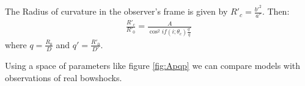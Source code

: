 The Radius of curvature in the observer's frame is given by $R'_c=\frac{b'^2}{a'}$. Then:
\begin{align}
  \frac{R'_c}{R'_0} = \frac{A}{\cos^2 i f(i;\theta_c)\frac{q'}{q}}
  \label{eq:Aprime}
\end{align}
where $q=\frac{R_0}{D}$ and $q' = \frac{R'_0}{D'}$. 

Using a space of parameters like figure \ref{fig:Apqp} we can compare models with observations of real bowshocks.


 

